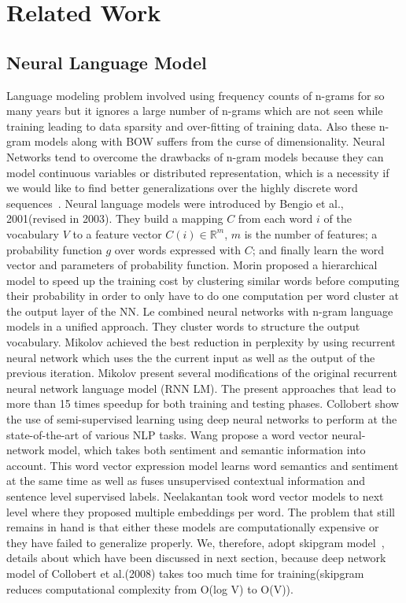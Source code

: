 \documentclass[11pt,a4paper]{article}
\begin{document}
\section{Related Work}
\subsection{Neural Language Model}
Language modeling problem involved using frequency counts of n-grams for so many years but it ignores a large number of n-grams which are not seen while training leading to data sparsity and over-fitting of training data. Also these n-gram models along with BOW suffers from the curse of dimensionality. Neural Networks tend to overcome the drawbacks of n-gram models because they can model continuous variables or distributed representation, which is a necessity if we would like to find better generalizations over the highly discrete word sequences~\cite{Bengio:03}. 
Neural language models were introduced by Bengio et al., 2001(revised in 2003\cite{Bengio:03}). They build a mapping $C$ from each word $i$ of the vocabulary $V$ to a feature vector $C(i) \in \mathbb{R}^m$, $m$ is the number of features; a probability function $g$ over words expressed with $C$; and finally learn the word vector and parameters of probability function.
Morin proposed a hierarchical model to speed up the training cost by clustering similar words before computing their probability in order to only have to do one computation per word cluster
at the output layer of the NN.
Le combined neural networks with n-gram language models in a unified approach. They cluster words to structure the output vocabulary. Mikolov achieved the best reduction in perplexity by using recurrent neural network which uses the the current input as well as the output of the previous iteration.
Mikolov present several modifications of the original recurrent neural network language model (RNN LM). The present approaches that lead to more than 15 times speedup for both training and testing phases.
Collobert show the use of semi-supervised learning using deep neural networks to perform at the state-of-the-art of various NLP tasks. Wang propose a word vector neural-network model, which takes both sentiment and semantic information into account. This word vector expression model learns word semantics and sentiment at the same time as well as fuses unsupervised contextual information and sentence level supervised labels. Neelakantan took word vector models to next level where they proposed multiple embeddings per word.
The problem that still remains in hand is that either these models are computationally expensive or they have failed to generalize properly. We, therefore, adopt skipgram model~\cite{Mikolov:13a}, details about which have been discussed in next section, because deep network model of Collobert et al.(2008) takes too much time for training(skipgram reduces computational complexity from O(log V) to O(V)).
\end{document}

